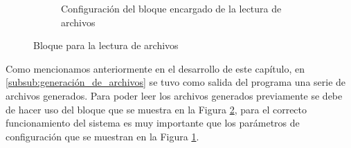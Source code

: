 \begin{figure}[htbp]
\begin{subfigure}[b]{0.45\textwidth}
        \caption{Configuración del bloque encargado de la lectura de archivos}
        \label{fig:config_from_file_IMU}
    \end{subfigure}
    \caption{Bloque para la lectura de archivos}
    \label{fig:read_from_file}
\end{figure}

Como mencionamos anteriormente en el desarrollo de este capítulo, en \ref{subsub:generación_de_archivos} se tuvo como salida del programa una serie de archivos generados. Para poder leer los archivos generados previamente se debe de hacer uso del bloque que se muestra en la Figura \ref{fig:read_from_file}, para el correcto funcionamiento del sistema es muy importante que los parámetros de configuración que se muestran en la Figura \ref{fig:config_from_file_IMU}.
\newpage

